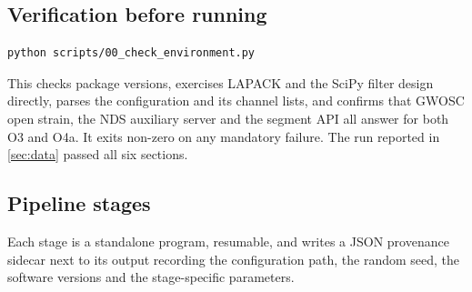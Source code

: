 \subsection{Verification before running}

\begin{lstlisting}[language=bash]
python scripts/00_check_environment.py
\end{lstlisting}

This checks package versions, exercises LAPACK and the SciPy filter design
directly, parses the configuration and its channel lists, and confirms that
GWOSC open strain, the NDS auxiliary server and the segment API all answer for
both O3 and O4a. It exits non-zero on any mandatory failure. The run reported
in \cref{sec:data} passed all six sections.

\subsection{Pipeline stages}

Each stage is a standalone program, resumable, and writes a JSON provenance
sidecar next to its output recording the configuration path, the random seed,
the software versions and the stage-specific parameters.

